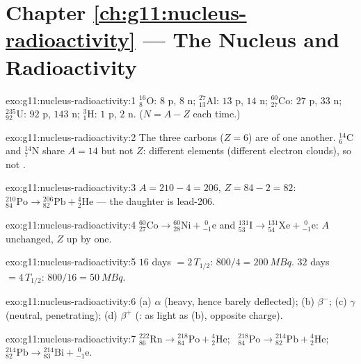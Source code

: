 \section*{Chapter \ref{ch:g11:nucleus-radioactivity} --- The Nucleus and Radioactivity}

\begin{solution}{exo:g11:nucleus-radioactivity:1}
${}^{16}_{8}\mathrm{O}$: $8$ p, $8$ n; ${}^{27}_{13}\mathrm{Al}$: $13$ p,
$14$ n; ${}^{60}_{27}\mathrm{Co}$: $27$ p, $33$ n;
${}^{235}_{92}\mathrm{U}$: $92$ p, $143$ n; ${}^{3}_{1}\mathrm{H}$: $1$ p,
$2$ n. ($N = A - Z$ each time.)
\end{solution}

\begin{solution}{exo:g11:nucleus-radioactivity:2}
The three carbons ($Z = 6$) are  of one another.
${}^{14}_{6}\mathrm{C}$ and ${}^{14}_{7}\mathrm{N}$ share $A = 14$ but not
$Z$: different elements (different electron clouds), so not .
\end{solution}

\begin{solution}{exo:g11:nucleus-radioactivity:3}
$A = 210 - 4 = 206$, $Z = 84 - 2 = 82$:
${}^{210}_{84}\mathrm{Po} \to {}^{206}_{82}\mathrm{Pb} +
{}^{4}_{2}\mathrm{He}$ --- the daughter is lead-206.
\end{solution}

\begin{solution}{exo:g11:nucleus-radioactivity:4}
${}^{60}_{27}\mathrm{Co} \to {}^{60}_{28}\mathrm{Ni} +
{}^{\;0}_{-1}\mathrm{e}$ and
${}^{131}_{53}\mathrm{I} \to {}^{131}_{54}\mathrm{Xe} +
{}^{\;0}_{-1}\mathrm{e}$: $A$ unchanged, $Z$ up by one.
\end{solution}

\begin{solution}{exo:g11:nucleus-radioactivity:5}
$16$ days $= 2\,T_{1/2}$: $800/4 = \qty{200}{MBq}$. $32$ days
$= 4\,T_{1/2}$: $800/16 = \qty{50}{MBq}$.
\end{solution}

\begin{solution}{exo:g11:nucleus-radioactivity:6}
(a) $\alpha$ (heavy, hence barely deflected); (b) $\beta^-$; (c) $\gamma$
(neutral, penetrating); (d) $\beta^+$ (: as light as (b), opposite
charge).
\end{solution}

\begin{solution}{exo:g11:nucleus-radioactivity:7}
${}^{222}_{86}\mathrm{Rn} \to {}^{218}_{84}\mathrm{Po} +
{}^{4}_{2}\mathrm{He}$; \
${}^{218}_{84}\mathrm{Po} \to {}^{214}_{82}\mathrm{Pb} +
{}^{4}_{2}\mathrm{He}$; \
${}^{214}_{82}\mathrm{Pb} \to {}^{214}_{83}\mathrm{Bi} +
{}^{\;0}_{-1}\mathrm{e}$.
\end{solution}

